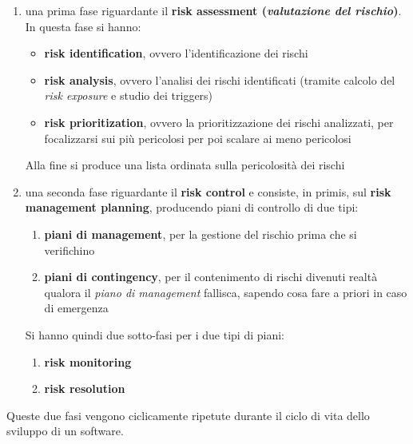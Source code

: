 \documentclass[a4paper,12pt, oneside]{book}
\begin{document}
\begin{enumerate}
  \item una prima fase riguardante il \textbf{risk assessment
    (\textit{valutazione del rischio})}. In questa fase si hanno:
  \begin{itemize}
    \item \textbf{risk identification}, ovvero l'identificazione dei rischi
    \item \textbf{risk analysis}, ovvero l'analisi dei rischi identificati
    (tramite calcolo del \textit{risk exposure} e studio dei triggers)
    \item \textbf{risk prioritization}, ovvero la prioritizzazione dei rischi
    analizzati, per focalizzarsi sui più pericolosi per poi scalare ai meno
    pericolosi
  \end{itemize}
  Alla fine si produce una lista ordinata sulla pericolosità dei rischi
  \item una seconda fase riguardante il \textbf{risk control} e consiste, in
  primis, sul \textbf{risk management planning}, producendo piani di controllo
  di due tipi:
  \begin{enumerate}
    \item \textbf{piani di management}, per la gestione del rischio prima che si
    verifichino
    \item \textbf{piani di contingency}, per il contenimento di rischi divenuti
    realtà qualora il \textit{piano di management} fallisca, sapendo cosa fare a
    priori in caso di emergenza
  \end{enumerate}
  Si hanno quindi due sotto-fasi per i due tipi di piani:
  \begin{enumerate}
    \item \textbf{risk monitoring}
    \item \textbf{risk resolution}
  \end{enumerate}
\end{enumerate}
Queste due fasi vengono ciclicamente ripetute durante il ciclo di vita dello
sviluppo di un software.\\
\end{document}
